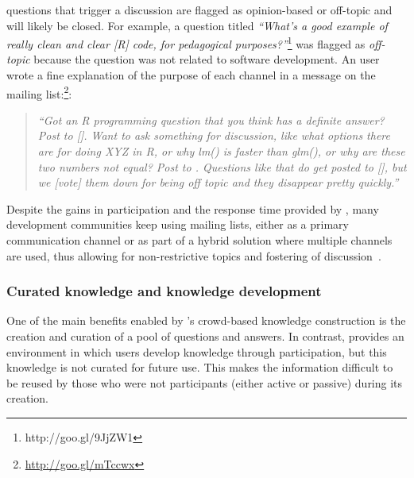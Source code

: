 \SO questions that trigger a discussion are flagged as opinion-based or off-topic and will likely be closed. 
For example, a question titled \textit{``What's a good example of really clean and clear [R] code, for pedagogical purposes?''}\footnote{http://goo.gl/9JjZW1} was flagged as \textit{off-topic} because the question was not related to software development.
An \RH user wrote a fine explanation of the purpose of each channel in a message on the mailing list:\footnote{\url{http://goo.gl/mTccwx}}:
    \begin{quote}
        \textit{``Got an R programming question that you think has a definite answer? Post to [\SO]. Want to ask something for discussion, like what options there are for doing XYZ in R, or why lm() is faster than glm(), or why are these two numbers not equal? Post to \RH. Questions like that do get posted to [\SO], but we [vote] them down for being off topic and they disappear pretty quickly.''}
    \end{quote}

Despite the gains in participation and the response time provided by \SO, many development communities keep using mailing lists, either as a primary communication channel or as part of a hybrid solution where multiple channels are used, thus allowing for non-restrictive topics and fostering of discussion~\cite{Squire2015a}.


\subsubsection{Curated knowledge and knowledge development}

One of the main benefits enabled by \SO's crowd-based knowledge construction is the creation and curation of a pool of questions and answers. In contrast, \RH provides an environment in which users
    develop knowledge through participation, but this knowledge is not curated for future use. This makes the information difficult to be reused by those who were not
    participants (either active or passive) during its creation.


